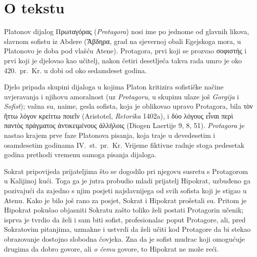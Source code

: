 


\section*{O tekstu}

Platonov dijalog Πρωταγόρας (\textit{Protagora}) nosi ime po jednome od glavnih likova, slavnom sofistu iz Abdere (\textgreek[variant=ancient]{Ἄβδηρα}, grad na sjevernoj obali Egejskoga mora, u Platonovo je doba pod vlašću Atene). Protagora, prvi koji se prozvao \textgreek[variant=ancient]{σοφιστής} i prvi koji je djelovao kao učitelj, nakon četiri desetljeća takva rada umro je oko 420.\ pr.~Kr. u dobi od oko sedamdeset godina. 

Djelo pripada skupini dijaloga u kojima Platon kritizira sofističke
načine uvjeravanja i njihovu amoralnost (uz \textit{Protagoru}, u skupinu ulaze još \textit{Gorgija} i \textit{Sofist}); važna su, naime, gesla sofista, koja je oblikovao upravo Protagora, bila \textgreek[variant=ancient]{τὸν ἥττω λόγον κρείττω ποιεῖν} (Aristotel, \textit{Retorika} 1402a), i \textgreek[variant=ancient]{δύο λόγους εἶναι περὶ παντὸς πράγματος ἀντικειμένους ἀλλήλοις} (Diogen Laertije 9, 8, 51). \textit{Protagora} je nastao krajem prve faze Platonova pisanja, koja traje u devedesetim i osamdesetim godinama IV.~st.\ pr.~Kr. Vrijeme fiktivne radnje stoga pedesetak godina prethodi vremenu samoga pisanja dijaloga.

Sokrat pripovijeda prijateljima što se dogodilo pri njegovu susretu s Protagorom u Kalijinoj kući. Toga ga je jutra probudio mladi prijatelj Hipokrat, uzbuđeno ga pozivajući da zajedno s njim posjeti najslavnijega od svih sofista koji je stigao u Atenu. Kako je bilo još rano za posjet, Sokrat i Hipokrat prošetali su. Pritom je Hipokrat pokušao objasniti Sokratu zašto toliko želi postati Protagorin učenik; isprva je tvrdio da želi i sam biti sofist, profesionalac poput Protagore, ali, pred Sokratovim pitanjima, uzmakne i ustvrdi da želi učiti kod Protagore da bi stekao obrazovanje dostojno slobodna čovjeka. Zna da je sofist mudrac koji omogućuje drugima da dobro govore, ali \textit{o čemu} govore, to Hipokrat ne može reći.

